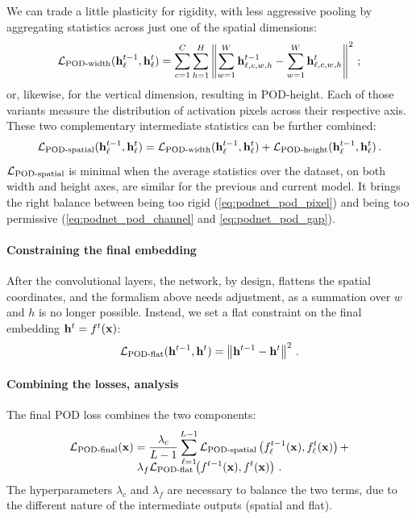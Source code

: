 We can trade a little plasticity for rigidity, with less aggressive pooling by aggregating
statistics across just one of the spatial dimensions:
%
\begin{equation}
    \mathcal{L}_{\text{POD-width}}(\mathbf{h}^{t-1}_\ell, \mathbf{h}^t_\ell)  = \sum_{c=1}^{C} \sum_{h=1}^{H} \left\Vert \sum_{w=1}^W \mathbf{h}^{t-1}_{\ell,c,w,h} - \sum_{w=1}^W \mathbf{h}^{t}_{\ell,c,w,h} \right\Vert^2\,;
    \label{eq:podnet_pod_width}
\end{equation}
%
or, likewise, for the vertical dimension, resulting in POD-height. Each of those variants measure
the distribution of activation pixels across their respective axis. These two complementary
intermediate statistics can be further combined:
%
\begin{equation}
    \mathcal{L}_{\text{POD-spatial}}(\mathbf{h}^{t-1}_\ell, \mathbf{h}^t_\ell) = \mathcal{L}_{\text{POD-width}}(\mathbf{h}^{t-1}_\ell, \mathbf{h}^t_\ell) + \mathcal{L}_{\text{POD-height}}(\mathbf{h}^{t-1}_\ell, \mathbf{h}^t_\ell)\,.
    \label{eq:podnet_pod_spatial}
\end{equation}
%
$\mathcal{L}_{\text{POD-spatial}}$ is minimal when the average statistics over the dataset, on both width
and height axes, are similar for the previous and current model. It brings the right balance between
being too rigid (\autoref{eq:podnet_pod_pixel}) and being too permissive (\autoref{eq:podnet_pod_channel} and
\ref{eq:podnet_pod_gap}).

\label{sec:podnet_pod_flat}
\paragraph{Constraining the final embedding} After the convolutional layers, the network, by design,
flattens the spatial coordinates, and the formalism above needs adjustment, as a summation over $w$
and $h$ is no longer possible. Instead, we set a flat constraint on the final embedding
$\mathbf{h}^{t} = f^{t}(\mathbf{x})$:
%
\begin{equation}
    \mathcal{L}_{\text{POD-flat}}(\mathbf{h}^{t-1}, \mathbf{h}^t) = \left\Vert \mathbf{h}^{t-1} - \mathbf{h}^t \right\Vert^2\,.
    \label{eq:podnet_pod_flat}
\end{equation}

\paragraph{Combining the losses, analysis} The final POD loss combines the two  components:
%
\begin{multline}
    \mathcal{L}_\text{POD-final}(\mathbf{x}) =  \frac{\lambda_{c}}{L-1}\sum_{\ell=1}^{L-1}  \mathcal{L}_{\text{POD-spatial}}\left(f^{t-1}_\ell(\mathbf{x}), f^t_\ell(\mathbf{x})\right) + \\[-0.8em]
    \lambda_{f} \mathcal{L}_\text{POD-flat}\left(f^{t-1}(\mathbf{x}), f^t(\mathbf{x})\right)\,.
    \label{eq:podnet_pod_final}
\end{multline}
%
The hyperparameters $\lambda_{c}$ and $\lambda_{f}$ are necessary to balance the two terms, due to
the different nature of the intermediate outputs (spatial and flat).

